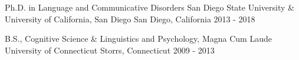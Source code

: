 
\begin{cventries}

  \iffalse %
  \cventry %
    {Degree}
    {Institution}
    {Location}
    {Mo. YEAR - Mo. YEAR} %
    {
      \begin{cvitems}
        \item {Description(s) bullet points}
      \end{cvitems}
    }
  \fi

  \cventry 
    {Ph.D. in Language and Communicative Disorders} %
    {San Diego State University \& University of California, San Diego} %
    {San Diego, California} %
    {2013 - 2018} %
    {}

  \cventry 
    {B.S., Cognitive Science \& Linguistics and Psychology, Magna Cum Laude} %
    {University of Connecticut} %
    {Storrs, Connecticut} %
    {2009 - 2013} %
    {} 

\end{cventries}
